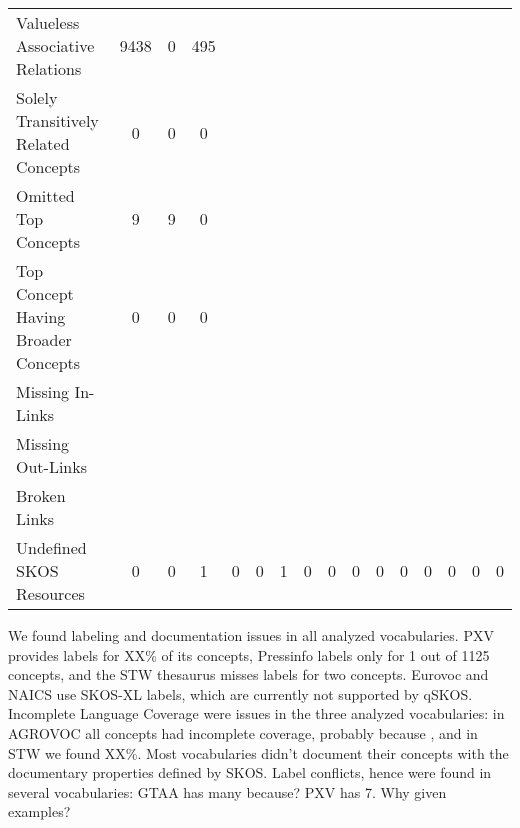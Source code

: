 \begin{table}[h]
\begin{tabular}{p{4cm}ccccccccccccccc}
Valueless Associative Relations & 9438 & 0 & 495 &&&&&&&&&&&& \\

Solely Transitively Related Concepts & 0 & 0 & 0 &&&&&&&&&&&& \\

Omitted Top Concepts & 9 & 9 & 0 &&&&&&&&&&&& \\

Top Concept Having Broader Concepts & 0 & 0 & 0 &&&&&&&&&&&& \\

\midrule

Missing In-Links &&&&&&&&&&&&&&& \\

Missing Out-Links &&&&&&&&&&&&&&& \\

Broken Links &&&&&&&&&&&&&&& \\


Undefined SKOS Resources & 0 & 0 & 1 & 0 & 0 & 1 & 0 & 0 & 0 & 0 & 0 & 0 & 0 & 0 & 0  \\

\bottomrule
\end{tabular}
\end{table}

We found labeling and documentation issues in all analyzed vocabularies. PXV provides labels for XX\% of its concepts, Pressinfo labels only for 1 out of 1125 concepts, and the STW thesaurus misses labels for two concepts. Eurovoc and NAICS use SKOS-XL labels, which are currently not supported by qSKOS.
Incomplete Language Coverage were issues in the three analyzed vocabularies: in AGROVOC all concepts had incomplete coverage, probably because , and in STW we found XX\%.
Most vocabularies didn't document their concepts with the documentary properties defined by SKOS.
Label conflicts, hence  were found in several vocabularies: GTAA has many because? PXV has 7. Why given examples?





% 
